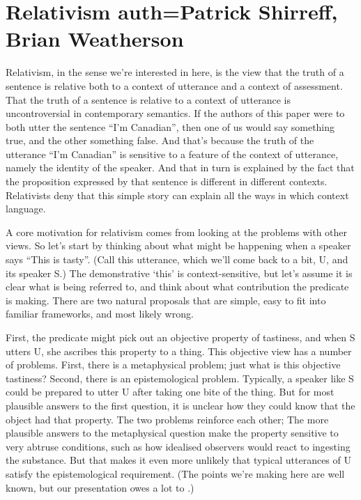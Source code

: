 \chapter[Relativism]{Relativism auth=Patrick Shirreff, Brian Weatherson}



Relativism, in the sense we're interested in here, is the view that the truth of a sentence is relative both to a context of utterance and a context of assessment. That the truth of a sentence is relative to a context of utterance is uncontroversial in contemporary semantics. If the authors of this paper were to both utter the sentence ``I'm Canadian'', then one of us would say something true, and the other something false. And that's because the truth of the utterance ``I'm Canadian'' is sensitive to a feature of the context of utterance, namely the identity of the speaker. And that in turn is explained by the fact that the proposition expressed by that sentence is different in different contexts. Relativists deny that this simple story can explain all the ways in which context language.

A core motivation for relativism comes from looking at the problems with other views. So let's start by thinking about what might be happening when a speaker says ``This is tasty''. (Call this utterance, which we'll come back to a bit, U, and its speaker S.) The demonstrative `this' is context-sensitive, but let's assume it is clear what is being referred to, and think about what contribution the predicate is making. There are two natural proposals that are simple, easy to fit into familiar frameworks, and most likely wrong.

First, the predicate might pick out an objective property of tastiness, and when S utters U, she ascribes this property to a thing. This objective view has a number of problems. First, there is a metaphysical problem; just what is this objective tastiness? Second, there is an epistemological problem. Typically, a speaker like S could be prepared to utter U after taking one bite of the thing. But for most plausible answers to the first question, it is unclear how they could know that the object had that property. The two problems reinforce each other; The more plausible answers to the metaphysical question make the property sensitive to very abtruse conditions, such as how idealised observers would react to ingesting the substance. But that makes it even more unlikely that typical utterances of U satisfy the epistemological requirement. (The points we're making here are well known, but our presentation owes a lot to  \citet{Lasersohn2005}.) 

